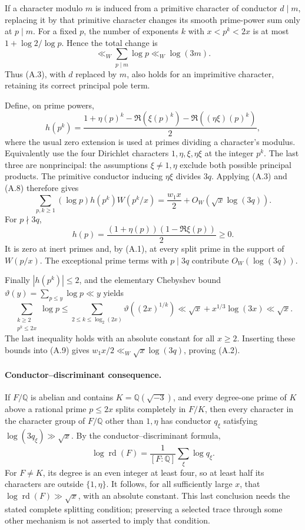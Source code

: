 If a character modulo $m$ is induced from a primitive character
of conductor $d\mid m$, replacing it by that primitive character
changes its smooth prime-power sum only at $p\mid m$.
For a fixed $p$, the number of exponents $k$ with
$x<p^k<2x$ is at most $1+\log2/\log p$. Hence the total change is
\[
 \ll_W \sum_{p\mid m}\log p
 \ll_W\log(3m).                                         \tag{A.8}
\]
Thus (A.3), with $d$ replaced by $m$, also holds for an
imprimitive character, retaining its correct principal pole term.

Define, on prime powers,
\[
 h(p^k)=\frac{1+\eta(p)^k-\Re(\xi(p)^k)
                    -\Re((\eta\xi)(p)^k)}2,
\]
where the usual zero extension is used at primes dividing
a character's modulus. Equivalently use the four Dirichlet
characters $1,\eta,\xi,\eta\xi$ at the integer $p^k$.
The last three are nonprincipal: the assumptions
$\xi\ne1,\eta$ exclude both possible principal products.
The primitive conductor inducing $\eta\xi$ divides $3q$.
Applying (A.3) and (A.8) therefore gives
\[
 \sum_{p,k\ge1}(\log p)h(p^k)W(p^k/x)
       =\frac{w_1x}{2}
                       +O_W(\sqrt{x}\log(3q)).           \tag{A.9}
\]
For $p\nmid3q$,
\[
 h(p)=\frac{(1+\eta(p))(1-\Re\xi(p))}{2}\ge0.
\]
It is zero at inert primes and, by (A.1), at every split
prime in the support of $W(p/x)$. The exceptional prime terms
with $p\mid3q$ contribute $O_W(\log(3q))$.

Finally $|h(p^k)|\le2$, and the elementary Chebyshev bound
$\vartheta(y)=\sum_{p\le y}\log p\ll y$ yields
\[
 \sum_{\substack{k\ge2\\p^k\le2x}}\log p
 \le\sum_{2\le k\le\log_2(2x)}\vartheta((2x)^{1/k})
 \ll \sqrt{x}+x^{1/3}\log(3x)
 \ll\sqrt{x}.                                           \tag{A.10}
\]
The last inequality holds with an absolute constant for
all $x\ge2$. Inserting these bounds into (A.9) gives
$w_1x/2\ll_W\sqrt{x}\log(3q)$, proving (A.2).

\paragraph{Conductor--discriminant consequence.}
If $F/\mathbb Q$ is abelian and contains
$K=\mathbb Q(\sqrt{-3})$, and every degree-one prime of $K$
above a rational prime $p\le2x$ splits completely in $F/K$,
then every character in the character group of $F/\mathbb Q$
other than $1,\eta$ has conductor $q_\xi$ satisfying
$\log(3q_\xi)\gg\sqrt{x}$.
By the conductor--discriminant formula,
\[
 \log\operatorname{rd}(F)
   =\frac1{[F:\mathbb Q]}\sum_\xi\log q_\xi.
\]
For $F\ne K$, its degree is an even integer at least four,
so at least half its characters are outside $\{1,\eta\}$.
It follows, for all sufficiently large $x$, that
$\log\operatorname{rd}(F)\gg\sqrt{x}$, with an absolute
constant. This last conclusion needs the stated complete
splitting condition; preserving a selected trace through
some other mechanism is not asserted to imply that condition.

